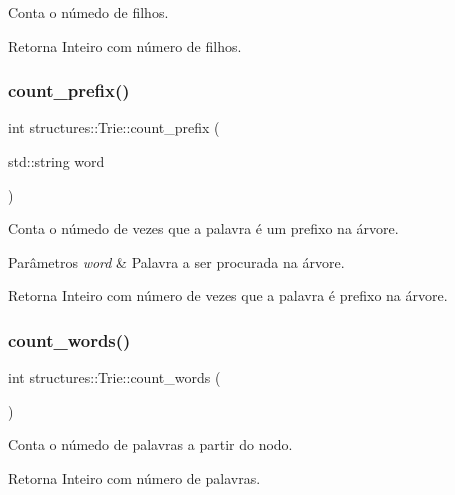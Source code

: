 Conta o númedo de filhos. 

\begin{DoxyReturn}{Retorna}
Inteiro com número de filhos. 
\end{DoxyReturn}
\mbox{\label{classstructures_1_1Trie_a6be483584143be5bdb2faff56e1e1c2c}} 
\subsubsection{\texorpdfstring{count\+\_\+prefix()}{count\_prefix()}}
{\footnotesize\ttfamily int structures\+::\+Trie\+::count\+\_\+prefix (\begin{DoxyParamCaption}\item[{std\+::string}]{word }\end{DoxyParamCaption})}



Conta o númedo de vezes que a palavra é um prefixo na árvore. 


\begin{DoxyParams}{Parâmetros}
{\em word} & Palavra a ser procurada na árvore.\\
\hline
\end{DoxyParams}
\begin{DoxyReturn}{Retorna}
Inteiro com número de vezes que a palavra é prefixo na árvore. 
\end{DoxyReturn}
\mbox{\label{classstructures_1_1Trie_a770d35e02fc8762e2eabf5d717602916}} 
\subsubsection{\texorpdfstring{count\+\_\+words()}{count\_words()}}
{\footnotesize\ttfamily int structures\+::\+Trie\+::count\+\_\+words (\begin{DoxyParamCaption}{ }\end{DoxyParamCaption})}



Conta o númedo de palavras a partir do nodo. 

\begin{DoxyReturn}{Retorna}
Inteiro com número de palavras. 
\end{DoxyReturn}
\mbox{\label{classstructures_1_1Trie_a7ad7b43b69ec6ae396de427bb5657445}} 
